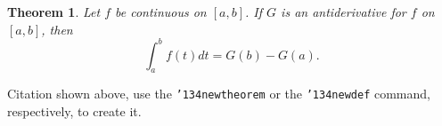 \documentclass{sig-alternate}
\begin{document}
\newtheorem{theorem}{Theorem}
\begin{theorem}
Let $f$ be continuous on $[a,b]$.  If $G$ is
an antiderivative for $f$ on $[a,b]$, then
\begin{displaymath}\int^b_af(t)dt = G(b) - G(a).\end{displaymath}
\end{theorem}


Citation \cite{salas:calculus} shown above,
use the \texttt{{\char'134}newtheorem} or the
\texttt{{\char'134}newdef} command,
respectively, to create it.







%

%
%
\end{document}
